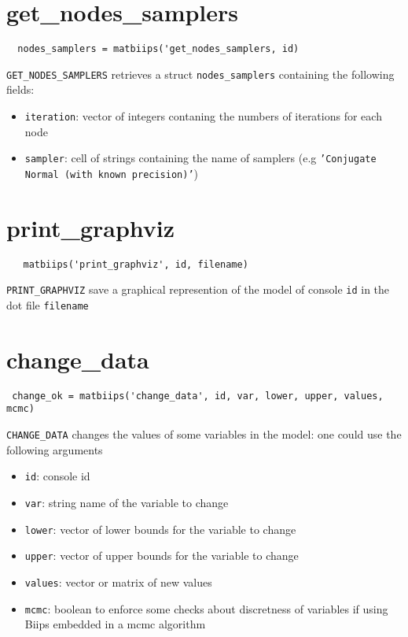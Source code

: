 \documentclass[11pt,twoside]{article}
\begin{document}
\section{get\_nodes\_samplers}

 \begin{lstlisting}
  nodes_samplers = matbiips('get_nodes_samplers, id)
 \end{lstlisting}

  \texttt{GET\_NODES\_SAMPLERS} retrieves a struct \texttt{nodes\_samplers} containing the following fields:

  \begin{itemize}
   \item \texttt{iteration}: vector of integers contaning the numbers of iterations for each node
   \item \texttt{sampler}: cell of strings containing the name of samplers (e.g \texttt{'Conjugate Normal (with known precision)'})
   \end{itemize}


\section{print\_graphviz}

 \begin{lstlisting}
   matbiips('print_graphviz', id, filename)
 \end{lstlisting}

  \texttt{PRINT\_GRAPHVIZ} save a graphical represention of the model of console \texttt{id} in the dot file \texttt{filename}

\section{change\_data}

 \begin{lstlisting}
 change_ok = matbiips('change_data', id, var, lower, upper, values, mcmc)
 \end{lstlisting}

 \texttt{CHANGE\_DATA} changes the values of some variables in the model: one could use the following
  arguments

  \begin{itemize}
   \item \texttt{id}: console id
   \item \texttt{var}: string name of the variable to change
   \item \texttt{lower}: vector of lower bounds for the variable to change
   \item \texttt{upper}: vector of upper bounds for the variable to change
   \item \texttt{values}: vector or matrix of new values
   \item \texttt{mcmc}: boolean to enforce some checks about discretness of variables if using Biips embedded in a mcmc algorithm
   \end{itemize}
\end{document}
